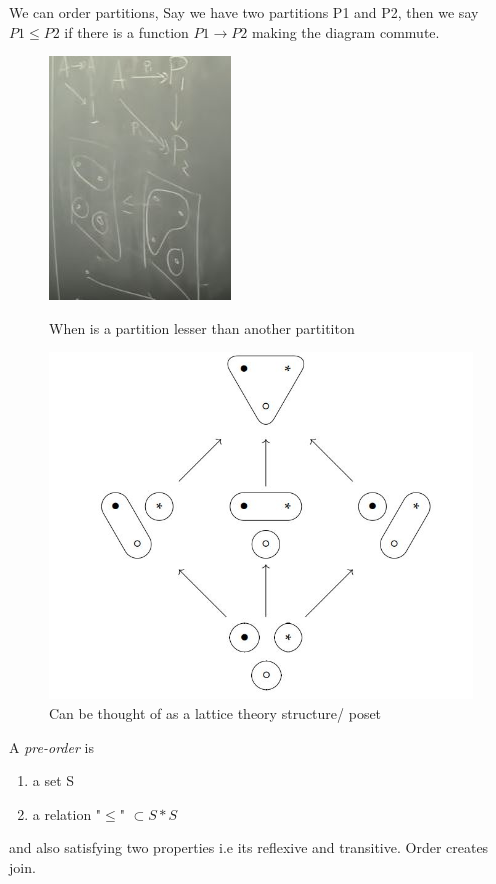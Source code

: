 \documentclass{article}
\begin{document}
We can order partitions, Say we have two partitions P1 and P2, then we say 
$P1 \leq P2$ if there is a function $P1 \rightarrow P2$ making the diagram commute.
\begin{figure}
    \centering
    \includegraphics{./images/1.jpg} 
    \caption{When is a partition lesser than another partititon}
    \label{fig:my_label} 
    \centering
    \includegraphics[scale=0.5]{./images/2.jpg} 
    \caption{Can be thought of as a lattice theory structure/ poset}
    \label{fig:my_label}
\end{figure}
\newpage
\noindent
A \emph{pre-order} is 
\begin{enumerate}
    \item a set S
    \item a relation "$\leq$" $\subset S* S$
\end{enumerate}
and also satisfying two properties i.e its reflexive and transitive. 
\newline
Order creates join. 
\end{document}
